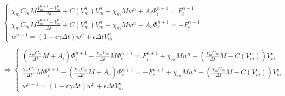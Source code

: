 \documentclass[a4paper]{article}
\begin{document}
\begin{equation}
\begin{gathered}
\begin{cases}
\chi_m C_m M\frac{V_m^{n+1} - V_m^n}{\Delta t} + C(V_m^n)V_m^n -\chi_mMw^n + A_i \Phi_i^{n+1}= F_i^{n+1} \\
\chi_m C_m M\frac{V_m^{n+1} - V_m^n}{\Delta t} + C(V_m^n)V_m^n -\chi_mMw^n - A_e \Phi_e^{n+1}= -F_e^{n+1} \\
w^{n+1} = (1-\epsilon \gamma \Delta t) w^n + \epsilon \Delta t V_m^n
\end{cases}
\\ \\  
\Rightarrow
\begin{cases}
\left( \frac{\chi_m C_m}{\Delta t} M + A_i \right ) \Phi_i^{n+1} - \frac{\chi_m C_m}{\Delta t} M \Phi_e^{n+1} = F_i^{n+1} + \chi_m M w^n + \left( \frac{\chi_m C_m}{\Delta t} M- C(V_m^n)\right) V_m^n \\ 
\frac{\chi_m C_m}{\Delta t} M  \Phi_i^{n+1} - \left(\frac{\chi_m C_m}{\Delta t} M + A_e \right) \Phi_e^{n+1} =  -F_e^{n+1} + \chi_m M w^n + \left( \frac{\chi_m C_m}{\Delta t} M- C(V_m^n)\right) V_m^n \\
w^{n+1} = (1-\epsilon \gamma \Delta t) w^n + \epsilon \Delta tV_m^n
\end{cases}
\end{gathered} 
\end{equation}
\vspace{3mm}
\end{document}
